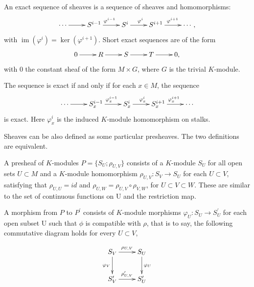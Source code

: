\documentclass[twoside]{article}
\begin{document}
\begin{definition}
An exact sequence of sheaves is a sequence of sheaves and homomorphisms:
\begin{equation*}
  \xymatrix{
 \cdots\ar[r]&S^{i-1}\ar[r]^{\varphi^{i-1}}&S^i\ar[r]^{\varphi^{i}}&S^{i+1}\ar[r]^{\varphi^{i+1}}&\cdots,\\
  }
\end{equation*}
 with $\operatorname{im}(\varphi^{i})=\ker(\varphi^{i+1})$. Short exact sequences are of the form
  \begin{equation*}
  \xymatrix{
 0\ar[r]&R\ar[r]&S\ar[r]&T\ar[r]&0,\\
  }
\end{equation*}
  with $0$ the constant sheaf of the form $M\times G$, where $G$ is the trivial $K$-module.
\end{definition}

  The sequence is exact if and only if for each $x\in M$, the sequence
 \begin{equation*}
  \xymatrix{
 \cdots\ar[r]&S_x^{i-1}\ar[r]^{\varphi_x^{i-1}}&S_x^i\ar[r]^{\varphi_x^{i}}&S_x^{i+1}\ar[r]^{\varphi_x^{i+1}}&\cdots\\
  }
\end{equation*} is exact. Here $\varphi_x^{i}$ is the induced $K$-module homomorphism on stalks.


Sheaves can be also defined as some particular presheaves. The two definitions are equivalent.

\begin{definition}
  A presheaf of $K$-modules $P=\{S_U;\rho_{U,V}\}$ consists of a $K$-module $S_U$ for all open sets $U\subset M$ and  a $K$-module homomorphism $\rho_{U,V}\colon S_V\to S_U$ for each $U\subset V$, satisfying that $\rho_{U,U}=id$ and  $\rho_{U,W}=\rho_{U,V}\circ \rho_{V,W}$, for $U\subset V\subset W$. These are similar to  the set of continuous functions on U and  the restriction map.

  A morphism from $P$ to $P^\prime$ consists of  $K$-module morphisms $\varphi_U\colon S_U\to S_U^\prime$ for each open subset U such that $\phi$ is compatible with $\rho$, that is to say,  the following commutative diagram holds for every $U\subset V$,

  \begin{equation*}
    \xymatrix{
    S_V\ar[r]^{\rho_{U,V}}\ar[d]_{\varphi_V}&S_U\ar[d]^{\varphi_U}\\
    S_V^\prime\ar[r]^{\rho_{U,V}^\prime}&S_U^\prime\\
    }
  \end{equation*}

\end{definition}
\end{document}
